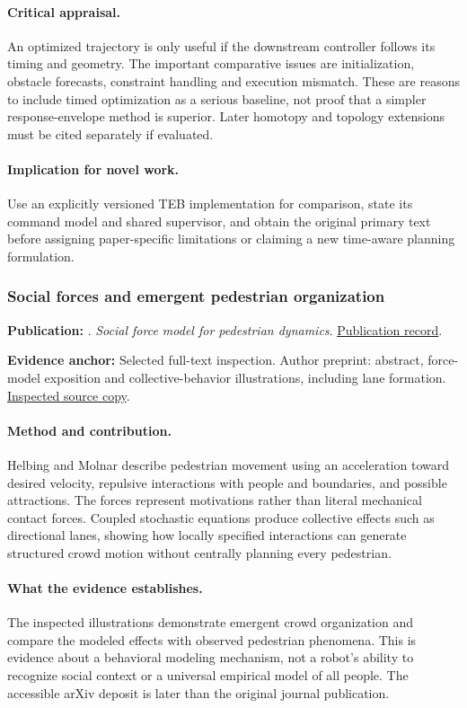 \paragraph{Critical appraisal.} An optimized trajectory is only useful if the downstream controller follows its timing and geometry. The important comparative issues are initialization, obstacle forecasts, constraint handling and execution mismatch. These are reasons to include timed optimization as a serious baseline, not proof that a simpler response-envelope method is superior. Later homotopy and topology extensions must be cited separately if evaluated.

\paragraph{Implication for novel work.} Use an explicitly versioned TEB implementation for comparison, state its command model and shared supervisor, and obtain the original primary text before assigning paper-specific limitations or claiming a new time-aware planning formulation.

\subsubsection{Social forces and emergent pedestrian organization}\label{paper:socialforce}
\textbf{Publication:} \citet{socialforce}. \emph{Social force model for pedestrian dynamics}. \href{https://doi.org/10.1103/physreve.51.4282}{Publication record}.

\textbf{Evidence anchor:} Selected full-text inspection. Author preprint: abstract, force-model exposition and collective-behavior illustrations, including lane formation. \href{https://arxiv.org/pdf/cond-mat/9805244}{Inspected source copy}.

\paragraph{Method and contribution.} Helbing and Molnar describe pedestrian movement using an acceleration toward desired velocity, repulsive interactions with people and boundaries, and possible attractions. The forces represent motivations rather than literal mechanical contact forces. Coupled stochastic equations produce collective effects such as directional lanes, showing how locally specified interactions can generate structured crowd motion without centrally planning every pedestrian.

\paragraph{What the evidence establishes.} The inspected illustrations demonstrate emergent crowd organization and compare the modeled effects with observed pedestrian phenomena. This is evidence about a behavioral modeling mechanism, not a robot's ability to recognize social context or a universal empirical model of all people. The accessible arXiv deposit is later than the original journal publication.

